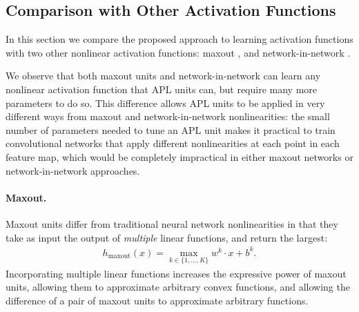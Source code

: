 \documentclass{article} \usepackage{iclr2015,times}
\begin{document}
\subsection{Comparison with Other Activation Functions}


In this section we compare the proposed approach to learning
activation functions with two other nonlinear activation functions:
maxout \citep{goodfellow2013maxout}, and network-in-network
\citep{lin2013network}.

We observe that both maxout units and network-in-network can learn any
nonlinear activation function that APL units can, but
require many more parameters to do so. This difference allows
APL units to be applied in very different ways from
maxout and network-in-network nonlinearities: the small number of
parameters needed to tune an APL unit makes it practical
to train convolutional networks that apply different nonlinearities at
each point in each feature map, which would be completely impractical
in either maxout networks or network-in-network approaches.

\paragraph{Maxout.}
Maxout units differ from traditional neural network nonlinearities in
that they take as input the output of \emph{multiple} linear
functions, and return the largest:
\begin{equation}
\begin{split}
h_{\mathrm{maxout}}(x) = \max_{k\in\{1,\ldots,K\}}
w^k \cdot x + b^k.
\end{split}
\end{equation}
Incorporating multiple linear functions increases the expressive power
of maxout units, allowing them to approximate arbitrary convex
functions, and allowing the difference of a pair of maxout units to
approximate arbitrary functions.
\end{document}
